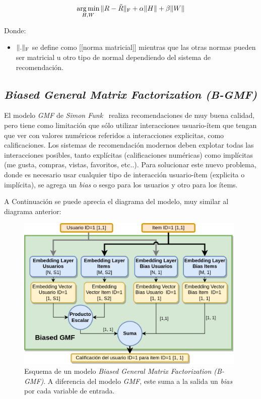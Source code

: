 \documentclass[11pt,a4paper,twoside]{thesis}
\begin{document}
\begin{equation}
	\underset{H, W}{\operatorname{arg\,min } }\, \|R - \tilde{R}\|_{\rm F} + \alpha\|H\| + \beta\|W\|
\end{equation}
\begin{description}
	\item[Donde:]
\end{description}
\begin{itemize}
	\item $\|.\|_{\rm F}$ se define como [[norma matricial]] mientras que las otras normas pueden ser matricial u otro tipo de normal dependiendo del sistema de recomendación.
\end{itemize}

\subsection{\textit{Biased General Matrix Factorization (B-GMF)}}

El modelo \textit{GMF} de \textit{Simon Funk}~\cite{afm, dlwkrs} realiza
recomendaciones de muy buena calidad, pero tiene como limitación que sólo
utilizar interacciones usuario-ítem que tengan que ver con valores numéricos
referidos a interacciones explicitas, como calificaciones. Los sistemas de
recomendación modernos deben explotar todas las interacciones posibles, tanto
explícitas (calificaciones numéricas) como implícitas (me gusta, compras,
vistas, favoritos, etc..). Para solucionar este nuevo problema, donde es
necesario usar cualquier tipo de interacción usuario-ítem (explicita o
implícita), se agrega un \textit{bias} o sesgo para los usuarios y otro para
los ítems.

A Continuación se puede aprecia el diagrama del modelo, muy similar al diagrama
anterior:

\begin{figure}[h!]
	\centering
	\includegraphics[width=11cm]{./images/Biased-GMF.png}
	\caption{
		Esquema de un modelo \textit{Biased General Matrix Factorization (B-GMF)}. A diferencia del modelo \textit{GMF}, este suma a la salida un \textit{bias} por cada variable de entrada.
	}
	\label{fig:BiasedGMFModel}
\end{figure}
\end{document}
